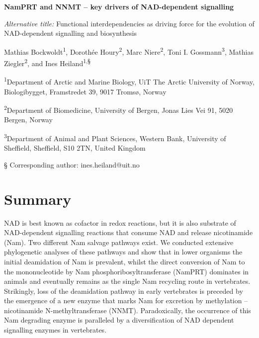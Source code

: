 
\noindent
{\huge\sffamily\bfseries NamPRT and NNMT – key drivers of NAD-dependent signalling \par}

\vspace{15mm}

\noindent
\textit{Alternative title:} Functional interdependencies as driving force for the evolution of NAD-dependent signalling and biosynthesis

\vspace{5mm}

\noindent
Mathias Bockwoldt\textsuperscript{1}, Dorothée Houry\textsuperscript{2}, Marc Niere\textsuperscript{2}, Toni I. Gossmann\textsuperscript{3}, Mathias Ziegler\textsuperscript{2}, and Ines Heiland\textsuperscript{1,§}

\vspace{1cm}

\noindent
\textsuperscript{1}Department of Arctic and Marine Biology, UiT The Arctic University of Norway, Biologibygget, Framstredet 39, 9017 Tromsø, Norway

\noindent
\textsuperscript{2}Department of Biomedicine, University of Bergen, Jonas Lies Vei 91, 5020 Bergen, Norway

\noindent
\textsuperscript{3}Department of Animal and Plant Sciences, Western Bank, University of Sheffield, Sheffield, S10 2TN, United Kingdom

\noindent
§ Corresponding author: ines.heiland@uit.no


\section*{Summary}

NAD is best known as cofactor in redox reactions, but it is also substrate of NAD-dependent signalling reactions that consume NAD and release nicotinamide (Nam). Two different Nam salvage pathways exist. We conducted extensive phylogenetic analyses of these pathways and show that in lower organisms the initial deamidation of Nam is prevalent, whilst the direct conversion of Nam to the mononucleotide by Nam phosphoribosyltransferase (NamPRT) dominates in animals and eventually remains as the single Nam recycling route in vertebrates. Strikingly, loss of the deamidation pathway in early vertebrates is preceded  by the emergence of a new enzyme that marks Nam for excretion by methylation – nicotinamide N-methyltransferase (NNMT). Paradoxically, the occurrence of this Nam degrading enzyme is paralleled by a diversification of NAD dependent signalling enzymes in vertebrates.


